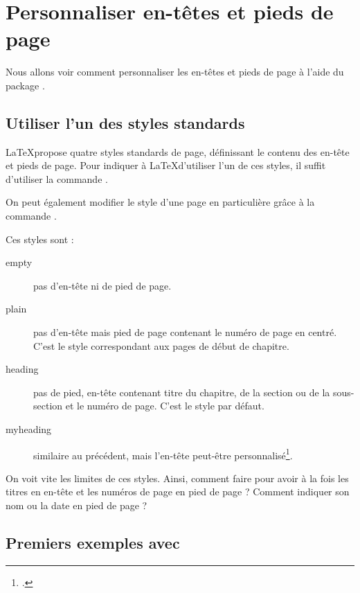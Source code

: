 \chapter{Personnaliser en-têtes et pieds de page}\label{entete}

\begin{prealable}
Nous allons voir comment personnaliser les en-têtes et pieds de page à l'aide du package .
\end{prealable}


\section{Utiliser l'un des styles standards}\label{stylesentete}

\LaTeX propose quatre styles standards de page, définissant le contenu des en-tête et pieds de page. Pour indiquer à \LaTeX d'utiliser l'un de ces styles, il suffit d'utiliser la commande .


On peut également modifier le style d'une page en particulière grâce à la commande .

Ces styles sont :
\begin{description}
\item[empty] pas d'en-tête ni de pied de page.
\item[plain] pas d'en-tête mais pied de page contenant le numéro de page en centré. C'est le style correspondant aux pages de début de chapitre. 
\item[heading] pas de pied, en-tête contenant titre du chapitre, de la section ou de la sous-section et le numéro de page. C'est le style par défaut. \label{styleentetes}
\item[myheading] similaire au précédent, mais l'en-tête peut-être personnalisé\footcite[Nous tenons cette information du][\pno~222, qui ne précise pas comment faire]{latex_companion}.
\end{description}



On voit vite les limites de ces styles. Ainsi, comment faire pour avoir à la fois les titres en en-tête et les numéros de page en pied de page ? Comment indiquer son nom ou la date en pied de page ?

\section{Premiers exemples avec }


